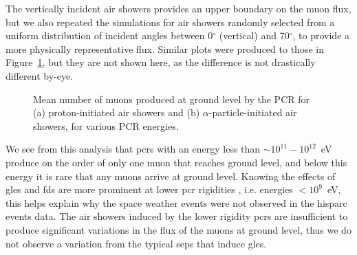 The vertically incident air showers provides an upper boundary on the muon flux, but we also repeated the simulations for air showers randomly selected from a uniform distribution of incident angles between 0$^\circ$ (vertical) and 70$^\circ$, to provide a more physically representative flux. Similar plots were produced to those in Figure~\ref{fig:shower_muons}, but they are not shown here, as the difference is not drastically different by-eye. 


\begin{figure}[ht!]
	\centering
	\qquad
	\caption{Mean number of muons produced at ground level by the PCR for (a) proton-initiated air showers and (b) $\alpha$-particle-initiated air showers, for various PCR energies.}
	\label{fig:shower_muons}
\end{figure}


We see from this analysis that \glspl{pcr} with an energy less than $\sim 10^{11}-10^{12}$~eV produce on the order of only one muon that reaches ground level, and below this energy it is rare that any muons arrive at ground level. Knowing the effects of \glspl{gle} and \glspl{fd} are more prominent at lower \gls{pcr} rigidities \citep{belov_solar_2005}, i.e. energies $<10^9$~eV, this helps explain why the space weather events were not observed in the \gls{hisparc} events data. The air showers induced by the lower rigidity \glspl{pcr} are insufficient to produce significant variations in the flux of the muons at ground level, thus we do not observe a variation from the typical \glspl{sep} that induce \glspl{gle}.

